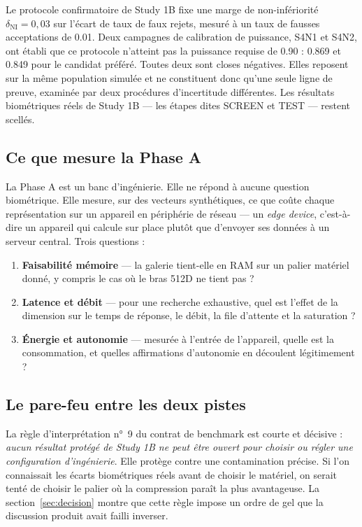 \documentclass[11pt,a4paper]{article}
\newcommand{\terme}[1]{\emph{#1}}
\begin{document}
Le protocole confirmatoire de Study 1B fixe une marge de non-infériorité
$\delta_{\mathrm{NI}} = 0{,}03$ sur l'écart de taux de faux rejets, mesuré à un taux
de fausses acceptations de \num{0,01}. Deux campagnes de calibration de puissance,
S4N1 et S4N2, ont établi que ce protocole n'atteint pas la puissance requise de
\num{0,90} : \num{0,869} et \num{0,849} pour le candidat préféré. Toutes deux sont
closes négatives. Elles reposent sur la même population simulée et ne constituent
donc qu'une seule ligne de preuve, examinée par deux procédures d'incertitude
différentes. Les résultats biométriques réels de Study 1B — les étapes dites SCREEN
et TEST — restent scellés.

\subsection{Ce que mesure la Phase A}

La Phase A est un banc d'ingénierie. Elle ne répond à aucune question biométrique.
Elle mesure, sur des vecteurs synthétiques, ce que coûte chaque représentation sur
un appareil en périphérie de réseau — un \terme{edge device}, c'est-à-dire un
appareil qui calcule sur place plutôt que d'envoyer ses données à un serveur
central. Trois questions :

\begin{enumerate}
\item \textbf{Faisabilité mémoire} — la galerie tient-elle en RAM sur un palier
  matériel donné, y compris le cas où le bras 512D ne tient pas ?
\item \textbf{Latence et débit} — pour une recherche exhaustive, quel est l'effet de
  la dimension sur le temps de réponse, le débit, la file d'attente et la saturation ?
\item \textbf{Énergie et autonomie} — mesurée à l'entrée de l'appareil, quelle est
  la consommation, et quelles affirmations d'autonomie en découlent légitimement ?
\end{enumerate}

\subsection{Le pare-feu entre les deux pistes}

La règle d'interprétation n°~9 du contrat de benchmark est courte et décisive :
\emph{aucun résultat protégé de Study 1B ne peut être ouvert pour choisir ou régler
une configuration d'ingénierie}. Elle protège contre une contamination précise. Si
l'on connaissait les écarts biométriques réels avant de choisir le matériel, on
serait tenté de choisir le palier où la compression paraît la plus avantageuse. La
section~\ref{sec:decision} montre que cette règle impose un ordre de gel que la
discussion produit avait failli inverser.
\end{document}
